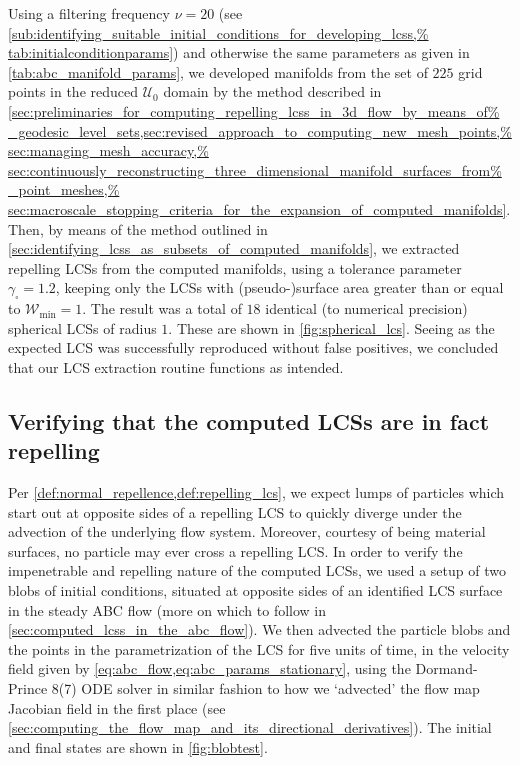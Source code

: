 Using a filtering frequency $\nu=20$ (see
\cref{sub:identifying_suitable_initial_conditions_for_developing_lcss,%
tab:initialconditionparams}) and otherwise the same parameters as given
in \cref{tab:abc_manifold_params}, we developed manifolds from the set
of $225$ grid points in the reduced $\mathcal{U}_{0}$ domain by the method
described in
\cref{sec:preliminaries_for_computing_repelling_lcss_in_3d_flow_by_means_of%
    _geodesic_level_sets,sec:revised_approach_to_computing_new_mesh_points,%
    sec:managing_mesh_accuracy,%
    sec:continuously_reconstructing_three_dimensional_manifold_surfaces_from%
    _point_meshes,%
    sec:macroscale_stopping_criteria_for_the_expansion_of_computed_manifolds}.
Then, by means of the method outlined in
\cref{sec:identifying_lcss_as_subsets_of_computed_manifolds}, we extracted
repelling LCSs from the computed manifolds, using a tolerance parameter
$\gamma_{\square}=1.2$, keeping only the LCSs with (pseudo-)surface area
greater than or equal to $\mathcal{W}_{\min}=1$. The result was a total of
$18$ identical (to numerical precision) spherical LCSs of radius $1$. These are
shown in \cref{fig:spherical_lcs}. Seeing as the expected LCS was successfully
reproduced without false positives, we concluded that our LCS extraction
routine functions as intended.




\subsection{Verifying that the computed LCSs are in fact repelling}
\label{sub:verifying_that_the_computed_lcss_are_in_fact_repelling}

Per \cref{def:normal_repellence,def:repelling_lcs}, we expect lumps of
particles which start out at opposite sides of a repelling LCS to quickly
diverge under the advection of the underlying flow system. Moreover, courtesy
of being material surfaces, no particle may ever cross a repelling LCS. In
order to verify the impenetrable and repelling nature of the computed LCSs, we
used a setup of two blobs of initial conditions, situated at opposite sides of
an identified LCS surface in the steady ABC flow (more on which to follow in
\cref{sec:computed_lcss_in_the_abc_flow}). We then advected the particle blobs
and the points in the parametrization of the LCS for five units of time,
in the velocity field given by \cref{eq:abc_flow,eq:abc_params_stationary},
using the Dormand-Prince 8(7) ODE solver in similar fashion to how we
`advected' the flow map Jacobian field in the first place
(see \cref{sec:computing_the_flow_map_and_its_directional_derivatives}).
The initial and final states are shown in \cref{fig:blobtest}.

